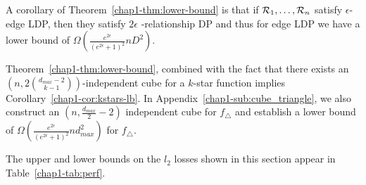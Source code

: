 
A corollary of Theorem~\ref{chap1-thm:lower-bound} is that if $\mathcal{R}_1, \ldots,
\mathcal{R}_n$ satisfy $\epsilon$-edge LDP, then they satisfy $2\epsilon$
-relationship DP and thus for edge LDP we have a lower bound of
$\Omega\left(\frac{e^{2\epsilon}}{(e^{2\epsilon}+1)^2}nD^2\right)$.

Theorem~\ref{chap1-thm:lower-bound}, combined with the fact that there exists an
$(n,2\binom{d_{max}-2}{k-1})$-independent cube for 
a $k$-star function 
implies Corollary~\ref{chap1-cor:kstars-lb}. 
In Appendix~\ref{chap1-sub:cube_triangle}, we also construct an $(n, \frac{d_{max}}{2}-2)$
independent cube 
for $f_\triangle$ and establish a lower bound of 
$\Omega(\frac{e^{2\epsilon}}{(e^{2\epsilon}+1)^2} nd_{max}^2)$ for
$f_\triangle$. 

The upper and lower bounds on the $l_2$ losses 
shown in
this section appear in Table~\ref{chap1-tab:perf}.
